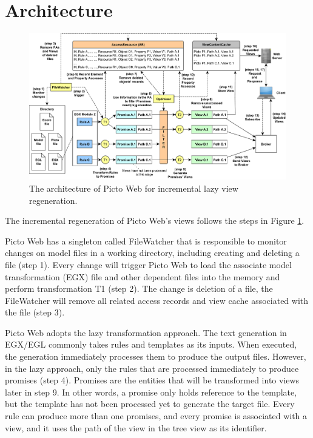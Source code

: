 \section{Architecture}
\label{architecture}

\begin{figure}
	\centering
	\includegraphics[width=\linewidth]{figures/architecture.pdf}
	\caption{The architecture of Picto Web for incremental lazy view regeneration.}
	\label{fig:architecture} 
\end{figure}

The incremental regeneration of Picto Web's views follows the steps in Figure \ref{fig:architecture}. 

Picto Web has a singleton called \textsf{FileWatcher} that is responsible to monitor changes on model files in a working directory, including creating and deleting a file (step 1). Every change will trigger Picto Web to load the associate  model transformation (EGX) file and other dependent files into the memory and perform transformation \textsf{T1} (step 2). The change is deletion of a file, the \textsf{FileWatcher} will remove all related access records and view cache associated with the file (step 3).

Picto Web adopts the lazy transformation approach. The text generation in EGX/EGL commonly takes rules and templates as its inputs.  When executed, the generation immediately processes them to produce the output files. However, in the lazy approach, only the rules that are processed immediately to produce promises (step 4). Promises are the entities that will be transformed into views later in step 9. In other words, a promise only holds reference to the template, but the template has not been processed yet to generate the target file. Every rule can produce more than one promises, and every promise is associated with a view, and it uses the path of the view in the tree view as its identifier. 

